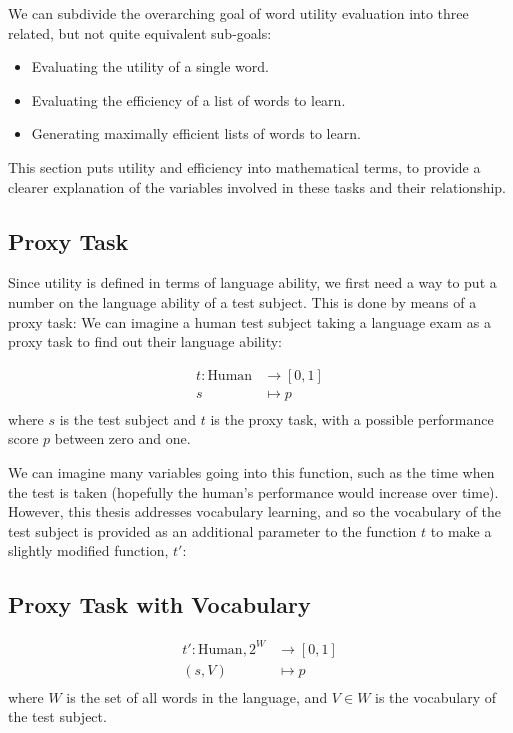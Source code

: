We can subdivide the overarching goal of word utility evaluation into three related, but not quite equivalent sub-goals:
\begin{itemize}
	\item Evaluating the utility of a single word.
	\item Evaluating the efficiency of a list of words to learn.
	\item Generating maximally efficient lists of words to learn.
\end{itemize}

This section puts utility and efficiency into mathematical terms, to provide a clearer explanation of the variables involved in these tasks and their relationship.

\subsection{Proxy Task}
Since utility is defined in terms of language ability, we first need a way to put a number on the language ability of a test subject. This is done by means of a proxy task: We can imagine a human test subject taking a language exam as a proxy task to find out their language ability:

\begin{align*}
	t: \text{Human} & \to [0, 1] \\
	s & \mapsto p            \\
\end{align*}
where $s$ is the test subject and $t$ is the proxy task, with a possible performance score $p$ between zero and one.

We can imagine many variables going into this function, such as the time when the test is taken (hopefully the human's performance would increase over time). However, this thesis addresses vocabulary learning, and so the vocabulary of the test subject is provided as an additional parameter to the function $t$ to make a slightly modified function, $t'$:

\subsection{Proxy Task with Vocabulary}
\begin{align*}
	t': \text{Human}, 2^{W} & \to [0, 1] \\
	(s, V) & \mapsto p               \\
\end{align*}
where $W$ is the set of all words in the language, and $V \in W$ is the vocabulary of the test subject.

